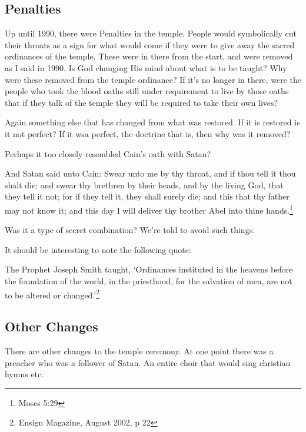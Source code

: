 \documentclass{article}
\begin{document}
\subsection{Penalties}

Up until 1990, there were Penalties in the temple. People would symbolically cut
their throats as a sign for what would come if they were to give away the sacred
ordinances of the temple. These were in there from the start, and were removed
as I said in 1990. Is God changing His mind about what is to be taught? Why were
these removed from the temple ordinance? If it's no longer in there, were the
people who took the blood oaths still under requirement to live by those oaths
that if they talk of the temple they will be required to take their own lives?

Again something else that has changed from what was restored. If it is restored
is it not perfect? If it wsa perfect, the doctrine that is, then why was it
removed?

Perhaps it too closely resembled Cain's oath with Satan?

\begin{displayquote}
And Satan said unto Cain: Swear unto me by thy throat, and if thou tell it thou 
shalt die; and swear thy brethren by their heads, and by the living God, that 
they tell it not; for if they tell it, they shall surely die; and this that thy 
father may not know it; and this day I will deliver thy brother Abel into thine 
hands.\footnote{Moses 5:29}
\end{displayquote}

Was it a type of secret combination? We're told to avoid such things.

It should be interesting to note the following quote:

\begin{displayquote}
The Prophet Joseph Smith taught, `Ordinances instituted in the heavens before 
the foundation of the world, in the priesthood, for the salvation of men, 
are not to be altered or changed.'\footnote{Ensign Magazine, August 2002, p 22}
\end{displayquote}

\subsection{Other Changes}

There are other changes to the temple ceremony. At one point there was a
preacher who was a follower of Satan. An entire choir that would sing christian
hymns etc.
\end{document}
